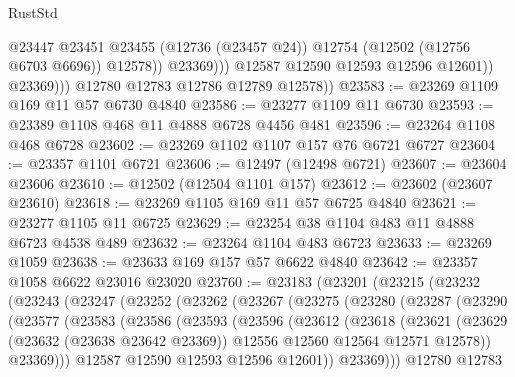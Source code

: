 \begin{lexlean}{RustStd}
\begin{coremodule}
                            @23447
                            @23451
                            @23455
                            (@12736 (@23457 @24))
                            @12754
                            (@12502 (@12756 @6703 @6696))
                            @12578))
                        @23369)))
                  @12587
                  @12590
                  @12593
                  @12596
                  @12601))
              @23369)))
        @12780
        @12783
        @12786
        @12789
        @12578))
@23583 := @23269 @1109 @169 @11 @57 @6730 @4840
@23586 := @23277 @1109 @11 @6730
@23593 := @23389 @1108 @468 @11 @4888 @6728 @4456 @481
@23596 := @23264 @1108 @468 @6728
@23602 := @23269 @1102 @1107 @157 @76 @6721 @6727
@23604 := @23357 @1101 @6721
@23606 := @12497 (@12498 @6721)
@23607 := @23604 @23606
@23610 := @12502 (@12504 @1101 @157)
@23612 := @23602 (@23607 @23610)
@23618 := @23269 @1105 @169 @11 @57 @6725 @4840
@23621 := @23277 @1105 @11 @6725
@23629 := @23254 @38 @1104 @483 @11 @4888 @6723 @4538 @489
@23632 := @23264 @1104 @483 @6723
@23633 := @23269 @1059
@23638 := @23633 @169 @157 @57 @6622 @4840
@23642 := @23357 @1058 @6622 @23016 @23020
@23760 := @23183
    (@23201
      (@23215
        (@23232
          (@23243
            (@23247
              (@23252
                (@23262
                  (@23267
                    (@23275
                      (@23280
                        (@23287
                          (@23290
                            (@23577
                              (@23583
                                (@23586
                                  (@23593
                                    (@23596
                                      (@23612
                                        (@23618
                                          (@23621
                                            (@23629
                                              (@23632 (@23638 @23642 @23369))
                                              @12556
                                              @12560
                                              @12564
                                              @12571
                                              @12578))
                                          @23369)))
                                    @12587
                                    @12590
                                    @12593
                                    @12596
                                    @12601))
                                @23369)))
                          @12780
                          @12783

\end{coremodule}
\end{lexlean}
